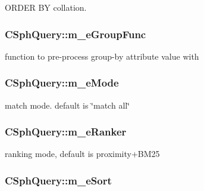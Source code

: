 O\-R\-D\-E\-R B\-Y collation. 

\hypertarget{classCSphQuery_ae921237bec923323f4462c09508d05d3}{
\subsubsection[{m\-\_\-e\-Group\-Func}]{ C\-Sph\-Query\-::m\-\_\-e\-Group\-Func}}\label{classCSphQuery_ae921237bec923323f4462c09508d05d3}


function to pre-\/process group-\/by attribute value with 

\hypertarget{classCSphQuery_a4bcc406daa74d2db796cfece980cad0e}{
\subsubsection[{m\-\_\-e\-Mode}]{ C\-Sph\-Query\-::m\-\_\-e\-Mode}}\label{classCSphQuery_a4bcc406daa74d2db796cfece980cad0e}


match mode. default is \char`\"{}match all\char`\"{} 

\hypertarget{classCSphQuery_aeecfd9ad18482d811bc30c38cc45a1b7}{
\subsubsection[{m\-\_\-e\-Ranker}]{ C\-Sph\-Query\-::m\-\_\-e\-Ranker}}\label{classCSphQuery_aeecfd9ad18482d811bc30c38cc45a1b7}


ranking mode, default is proximity+\-B\-M25 

\hypertarget{classCSphQuery_a2da4282d6340a2a90b3c6d19ef439e90}{
\subsubsection[{m\-\_\-e\-Sort}]{ C\-Sph\-Query\-::m\-\_\-e\-Sort}}\label{classCSphQuery_a2da4282d6340a2a90b3c6d19ef439e90}


